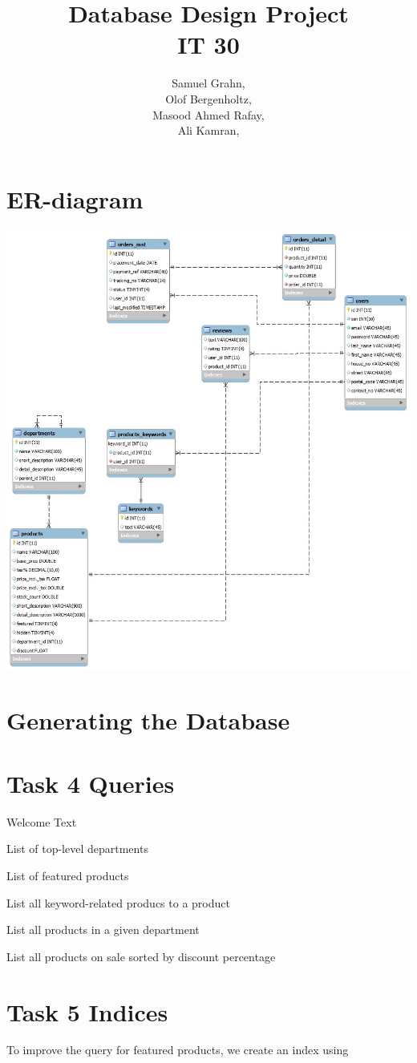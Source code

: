 \documentclass{article}
\title{
  Database Design Project\\
  IT 30
}
\author{
  Samuel Grahn, \email{samuel.grahn@outlook.com}\\
  Olof Bergenholtz, \email{obergenholtz@gmail.com}\\
  Masood Ahmed Rafay, \email{Rafayqureshi2010@gmail.com}\\
  Ali Kamran, \email{alkmrn1@gmail.com}\\
}
\newcommand{\sql}[1]{}
\begin{document}
\maketitle
\newpage
\section*{ER-diagram}
\includegraphics[width=\linewidth]{index.jpg}

\section*{Generating the Database}
\sql{creation}

\section*{Task 4 Queries}
Welcome Text
\sql{welcome}
List of top-level departments
\sql{topleveldpt}
List of featured products
\sql{featured_products}
List all keyword-related producs to a product
\sql{similar_products}
List all products in a given department
\sql{dept_products}
List all products on sale sorted by discount percentage
\sql{sale}

\section*{Task 5 Indices}
To improve the query for featured products, we create an index using\\
\sql{indices}
\end{document}
